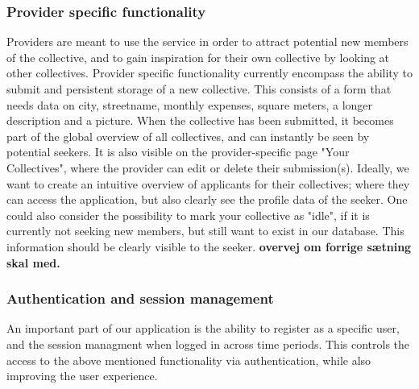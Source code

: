 \subsubsection{Provider specific functionality}

Providers are meant to use the service in order to attract potential new members of the collective, and to gain inspiration for their own collective by looking at other collectives. 
Provider specific functionality currently encompass the ability to submit and persistent storage of a new collective. This consists of a form that needs data on city, streetname, monthly expenses, square meters, a longer description and a picture.
When the collective has been submitted, it becomes part of the global overview of all collectives, and can instantly be seen by potential seekers. 
It is also visible on the provider-specific page "Your Collectives", where the provider can edit or delete their submission(s). 
Ideally, we want to create an intuitive overview of applicants for their collectives; where they can access the application, but also clearly see the profile data of the seeker. 
One could also consider the possibility to mark your collective as "idle", if it is currently not seeking new members, but still want to exist in our database. This information should be clearly visible to the seeker. 
\textbf{overvej om forrige sætning skal med.}

\subsubsection{Authentication and session management}

An important part of our application is the ability to register as a specific user, and the session managment when logged in across time periods. 
This controls the access to the above mentioned functionality via authentication, while also improving the user experience. 






